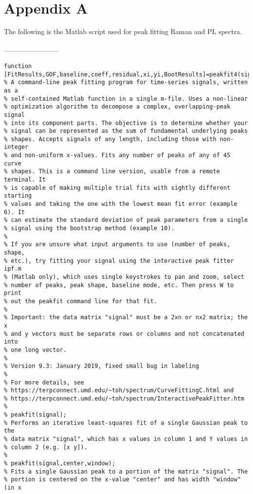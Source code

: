 \section{Appendix A}
\label{app:Matlab}

The following is the Matlab script used for peak fitting Raman and PL spectra.\\ \\
------------------------
\begin{lstlisting}
function [FitResults,GOF,baseline,coeff,residual,xi,yi,BootResults]=peakfit4(signal,center,window,NumPeaks,peakshape,extra,NumTrials,start,autozero,fixedparameters,plots,bipolar,minwidth,DELTA,clipheight)
% A command-line peak fitting program for time-series signals, written as a
% self-contained Matlab function in a single m-file. Uses a non-linear
% optimization algorithm to decompose a complex, overlapping-peak signal
% into its component parts. The objective is to determine whether your
% signal can be represented as the sum of fundamental underlying peaks
% shapes. Accepts signals of any length, including those with non-integer
% and non-uniform x-values. Fits any number of peaks of any of 45 curve
% shapes. This is a command line version, usable from a remote terminal. It
% is capable of making multiple trial fits with sightly different starting
% values and taking the one with the lowest mean fit error (example 6). It
% can estimate the standard deviation of peak parameters from a single
% signal using the bootstrap method (example 10).
%
% If you are unsure what input arguments to use (number of peaks, shape,
% etc.), try fitting your signal using the interactive peak fitter ipf.m
% (Matlab only), which uses single keystrokes to pan and zoom, select
% number of peaks, peak shape, baseline mode, etc. Then press W to print
% out the peakfit command line for that fit.
%
% Important: the data matrix "signal" must be a 2xn or nx2 matrix; the x
% and y vectors must be separate rows or columns and not concatenated into
% one long vector.
%
% Version 9.3: January 2019, fixed small bug in labeling 
%
% For more details, see
% https://terpconnect.umd.edu/~toh/spectrum/CurveFittingC.html and
% https://terpconnect.umd.edu/~toh/spectrum/InteractivePeakFitter.htm
%
% peakfit(signal);       
% Performs an iterative least-squares fit of a single Gaussian peak to the
% data matrix "signal", which has x values in column 1 and Y values in
% column 2 (e.g. [x y]). 
%
% peakfit(signal,center,window);
% Fits a single Gaussian peak to a portion of the matrix "signal". The
% portion is centered on the x-value "center" and has width "window" (in x

\end{lstlisting}
